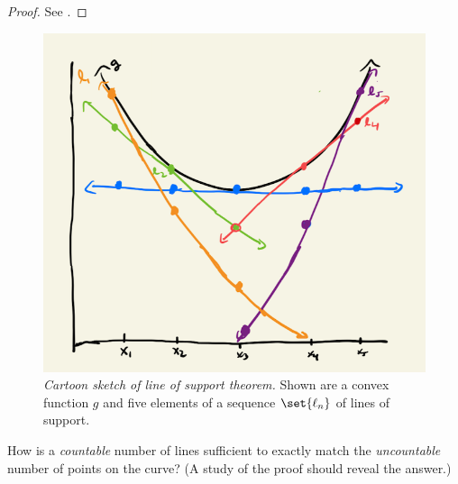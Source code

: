 \documentclass{article} %
\begin{document}
\begin{proof}
See \cite[Theorem 6.3.4]{ash2000probability}.	
\end{proof}

\begin{figure}[H]
\centering
\includegraphics[width=.5\textwidth]{images/line_of_support_theorem}
\caption{\textit{Cartoon sketch of line of support theorem.}   Shown are a convex function $g$ and five elements of a sequence $\set{\ell_n}$ of lines of support.}
\end{figure}


\begin{question}
How is a \textit{countable} number of lines sufficient to exactly match the \textit{uncountable} number of points on the curve?	(A study of the proof should reveal the answer.)
\end{question}
\end{document}
